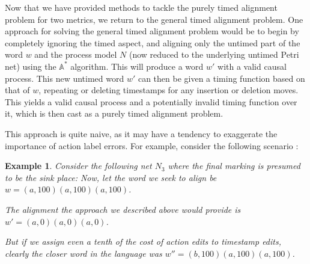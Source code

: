 \documentclass[conference]{IEEEtran}
\newcommand\eye{\ensurestackMath{\stackinset{c}{}{c}{-.33pt}%
		{\bullet}{\bigcirc}}}
\newtheorem{example}{Example}
\begin{document}
	Now that we have provided methods to tackle the purely timed alignment problem for two metrics, we return to the general timed alignment problem. 
	One approach for solving the general timed alignment problem would be to begin by completely ignoring the timed aspect, and aligning only the untimed part of the word $w$ and the process model $N$ (now reduced to the underlying untimed Petri net) using the $\mathbb{A}^*$ algorithm\cite{Adriansyah2014AligningOA}. This will produce %
	a word $w'$ with a valid causal process. This new untimed word $w'$ can then be given a timing function based on that of $w$, %
	repeating or deleting timestamps for any insertion or deletion moves. This yields a valid causal process and a potentially invalid timing function over it, which is then cast as a purely timed alignment problem. 
	
	This approach is quite naive, as it may have a tendency to exaggerate the importance of action label errors. For example, consider the following scenario : 
	
	\begin{example}
		Consider the following net $N_3$ where the final marking is presumed to be the sink place: 
		\adjustbox{scale=0.8}{
			\begin{tikzcd}
				& {} && {} && {} \\
				\eye_I & {\fbox{a}} & \bigcirc & {\fbox{a}} & \bigcirc & {\fbox{a}} &\bigcirc_f \\
				& {\fbox{b}} & \bigcirc & {\fbox{a}} & \bigcirc & {\fbox{a}} \\
				\arrow[from=2-1, to=2-2]
				\arrow[curve={height=12pt}, from=2-1, to=3-2]
				\arrow[from=2-2, to=2-3]
				\arrow[from=2-3, to=2-4]
				\arrow[from=2-4, to=2-5]
				\arrow[from=2-5, to=2-6]
				\arrow[from=2-6, to=2-7]
				\arrow[from=3-2, to=3-3]
				\arrow[from=3-3, to=3-4]
				\arrow[from=3-4, to=3-5]
				\arrow[from=3-5, to=3-6]
				\arrow[curve={height=12pt}, from=3-6, to=2-7]
				\arrow["{[0,0]}"{description, pos=0.2}, draw=white, from=2-2, to=1-2]
				\arrow["{[0,0]}"{description, pos=0.1}, draw=white, from=2-4, to=1-4]
				\arrow["{[0,0]}"{description, pos=0.1}, draw=white, from=2-6, to=1-6]
				\arrow["{[100,100]}"{description, pos=0.2}, draw=white, from=3-2, to=2-2]
				\arrow["{[100,100]}"{description, pos=0.2}, draw=white, from=3-4, to=2-4]
				\arrow["{[100,100]}"{description, pos=0.2}, draw=white, from=3-6, to=2-6]
			\end{tikzcd}
		}
		Now, let the word we seek to align be $w = (a, 100)(a, 100)(a, 100)$. 
		
		The alignment the approach we described above would provide is $w' = (a, 0)(a, 0)(a, 0)$. 
		
		But if we assign even a tenth of the cost of action edits to timestamp edits, clearly the closer word in the language was $w'' = (b, 100)(a, 100)(a, 100)$. 
	\end{example}
	
\end{document}
